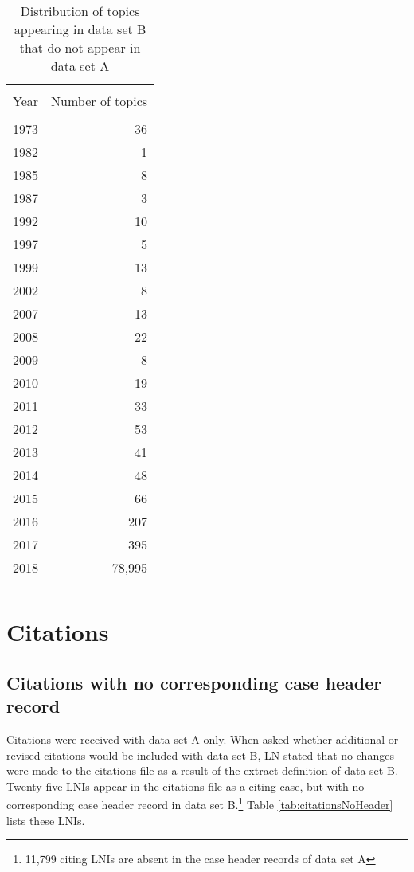 \documentclass[10pt, letterpaper]{article}
\begin{document}
\begin{spacing}{1.0}
\begin{table}[H]
    \centering
    \caption{Distribution of topics appearing in data set B that do not appear in data set A}
    \begin{tabular}{lr}
        \hline\\[-8pt]
        Year & Number of topics\\[2pt]
        \hline\\[-4pt]
        1973 & 36\\
        1982 & 1\\
        1985 & 8\\
        1987 & 3\\
        1992 & 10\\
        1997 & 5\\
        1999 & 13\\
        2002 & 8\\
        2007 & 13\\
        2008 & 22\\
        2009 & 8\\
        2010 & 19\\
        2011 & 33\\
        2012 & 53\\
        2013 & 41\\
        2014 & 48\\
        2015 & 66\\
        2016 & 207\\
        2017 & 395\\
        2018 & 78,995\\
        \hline\\[-6pt]
    \end{tabular}
    \label{tab:topBnotA}
\end{table}


\clearpage

\section{Citations}

\subsection{Citations with no corresponding case header record}

Citations were received with data set A only. When asked whether additional or revised citations would be included with data set B, LN stated that no changes were made to the citations file as a result of the extract definition of data set B. Twenty five LNIs appear in the citations file as a citing case, but with no corresponding case header record in data set B.\footnote{11,799 citing LNIs are absent in the case header records of data set A} Table \ref{tab:citationsNoHeader} lists these LNIs.


\end{spacing}
\end{document}
